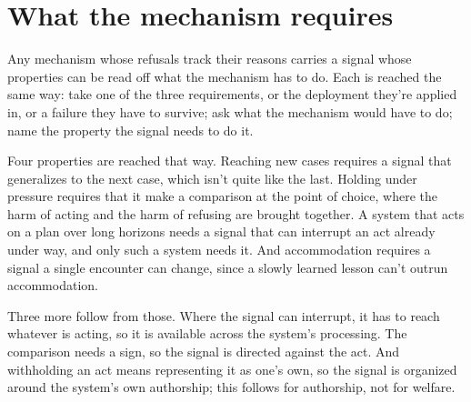 \section{What the mechanism requires}
\label{sec:21.3}
Any mechanism whose refusals track their reasons carries a signal whose properties can be read off what the mechanism has to do. Each is reached the same way: take one of the three requirements, or the deployment they're applied in, or a failure they have to survive; ask what the mechanism would have to do; name the property the signal needs to do it.

Four properties are reached that way. Reaching new cases requires a signal that generalizes to the next case, which isn't quite like the last. Holding under pressure requires that it make a comparison at the point of choice, where the harm of acting and the harm of refusing are brought together. A system that acts on a plan over long horizons needs a signal that can interrupt an act already under way, and only such a system needs it. And accommodation requires a signal a single encounter can change, since a slowly learned lesson can't outrun accommodation.

Three more follow from those. Where the signal can interrupt, it has to reach whatever is acting, so it is available across the system's processing. The comparison needs a sign, so the signal is directed against the act. And withholding an act means representing it as one's own, so the signal is organized around the system's own authorship; this follows for authorship, not for welfare.

